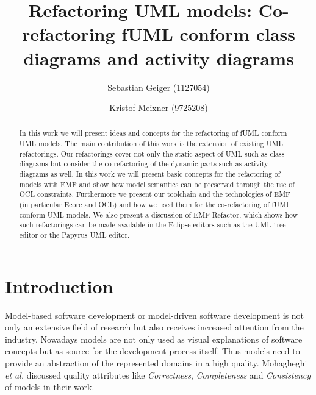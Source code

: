 \documentclass{llncs}
\begin{document}
\renewcommand{\thelstlisting}{\arabic{lstlisting}}
\pagestyle{plain}

\title{Refactoring UML models: Co-refactoring fUML conform class diagrams and activity diagrams}

\author{Sebastian Geiger (1127054) \and Kristof Meixner (9725208)}
\maketitle

\begin{abstract}
In this work we will present ideas and concepts for the refactoring of fUML conform UML models. The main contribution of this work is 
the extension of existing UML refactorings. Our refactorings cover not only the static aspect of UML such as class diagrams but consider 
the co-refactoring of the dynamic parts such as activity diagrams as well. In this work we will present basic concepts for the refactoring 
of models with EMF and show how model semantics can be preserved through the use of OCL constraints. Furthermore we present our toolchain 
and the technologies of EMF (in particular Ecore and OCL) and how we used them for the co-refactoring of fUML conform UML models. We 
also present a discussion of EMF Refactor, which shows how such refactorings can be made available in the Eclipse editors such as 
the UML tree editor or the Papyrus UML editor.
\end{abstract}

\tableofcontents
\newpage


\section{Introduction}

Model-based software development or model-driven software development is not only an extensive field of research but
also receives increased attention from the industry. Nowadays models are not only used as visual explanations of
software concepts but as source for the development process itself. Thus models need to provide an abstraction of
the represented domains in a high quality. Mohagheghi \textit{et al.} \cite{DBLP:journals/infsof/MohagheghiDN09} discussed 
quality attributes like \textit{Correctness}, \textit{Completeness} and \textit{Consistency} of models in their work.
\end{document}
